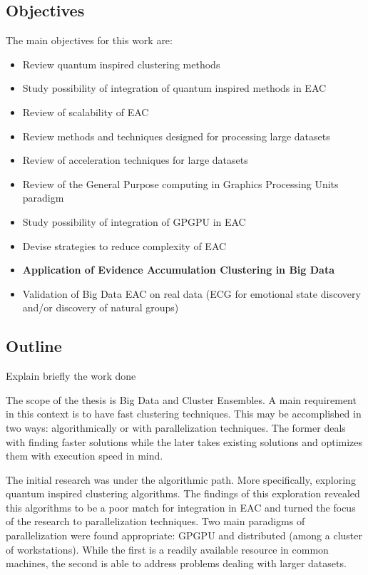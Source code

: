 \subsection{Objectives}
The main objectives for this work are:
\begin{itemize}

\item Review quantum inspired clustering methods

\item Study possibility of integration of quantum inspired methods in EAC

\item Review of scalability of EAC

\item Review methods and techniques designed for processing large datasets

\item Review of acceleration techniques for large datasets

\item Review of the General Purpose computing in Graphics Processing Units paradigm

\item Study possibility of integration of GPGPU in EAC

\item Devise strategies to reduce complexity of EAC

\item \textbf{Application of Evidence Accumulation Clustering in Big Data}

\item Validation of Big Data EAC on real data (ECG for emotional state discovery and/or discovery of natural groups)
\end{itemize}

\subsection{Outline}

Explain briefly the work done

The scope of the thesis is Big Data and Cluster Ensembles. A main requirement in this context is to have fast clustering techniques. This may be accomplished in two ways: algorithmically or with parallelization techniques. The former deals with finding faster solutions while the later takes existing solutions and optimizes them with execution speed in mind.

The initial research was under the algorithmic path. More specifically, exploring quantum inspired clustering algorithms. The findings of this exploration revealed this algorithms to be a poor match for integration in EAC and turned the focus of the research to parallelization techniques. Two main paradigms of parallelization were found appropriate: GPGPU and distributed (among a cluster of workstations). While the first is a readily available resource in common machines, the second is able to address problems dealing with larger datasets.

